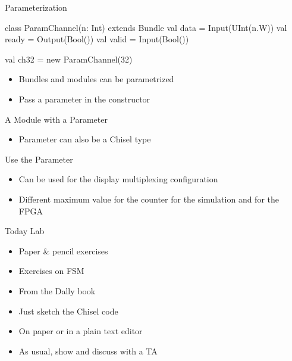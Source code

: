 \begin{frame}[fragile]{Parameterization}
\begin{chisel}
class ParamChannel(n: Int) extends Bundle {
  val data = Input(UInt(n.W))
  val ready = Output(Bool())
  val valid = Input(Bool())
}

val ch32 = new ParamChannel(32)
\end{chisel}
\begin{itemize}
\item Bundles and modules can be parametrized
\item Pass a parameter in the constructor
\end{itemize}

\end{frame}
\begin{frame}[fragile]{A Module with a Parameter}
\begin{itemize}
\item Parameter can also be a Chisel type
\end{itemize}
\end{frame}

\begin{frame}[fragile]{Use the Parameter}
\begin{itemize}
\item Can be used for the display multiplexing configuration
\item Different maximum value for the counter for the simulation and for the FPGA
\end{itemize}
\end{frame}


\begin{frame}[fragile]{Today Lab}
\begin{itemize}
\item Paper \& pencil exercises
\item Exercises on FSM
\item From the Dally book
\item Just sketch the Chisel code
\item On paper or in a plain text editor
\item As usual, show and discuss with a TA
\end{itemize}
\end{frame}


